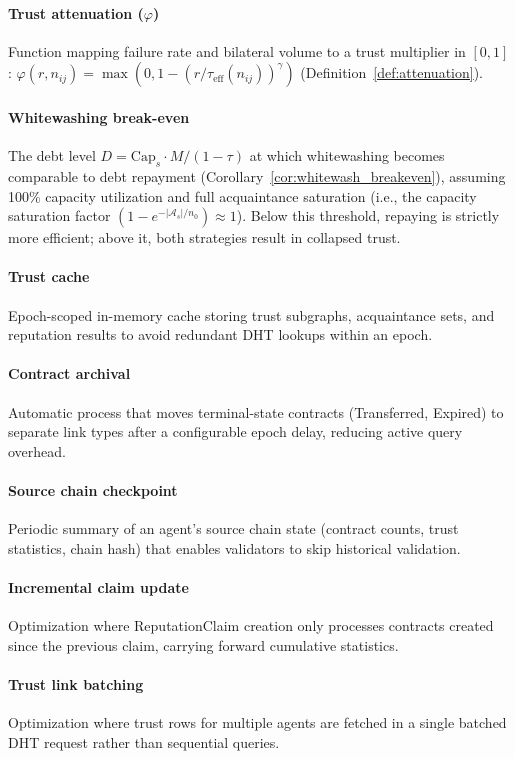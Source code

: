 \documentclass[11pt]{article}
\begin{document}
\paragraph{Trust attenuation ($\varphi$)} Function mapping failure rate and bilateral volume to a trust multiplier in $[0,1]$: $\varphi(r, n_{ij}) = \max(0, 1 - (r/\tau_{\text{eff}}(n_{ij}))^\gamma)$ (Definition~\ref{def:attenuation}).
\paragraph{Whitewashing break-even} The debt level $D = \text{Cap}_s \cdot M / (1-\tau)$ at which whitewashing becomes comparable to debt repayment (Corollary~\ref{cor:whitewash_breakeven}), assuming 100\% capacity utilization and full acquaintance saturation (i.e., the capacity saturation factor $(1 - e^{-|\mathcal{A}_s|/n_0}) \approx 1$). Below this threshold, repaying is strictly more efficient; above it, both strategies result in collapsed trust.
\paragraph{Trust cache} Epoch-scoped in-memory cache storing trust subgraphs, acquaintance sets, and reputation results to avoid redundant DHT lookups within an epoch.
\paragraph{Contract archival} Automatic process that moves terminal-state contracts (Transferred, Expired) to separate link types after a configurable epoch delay, reducing active query overhead.
\paragraph{Source chain checkpoint} Periodic summary of an agent's source chain state (contract counts, trust statistics, chain hash) that enables validators to skip historical validation.
\paragraph{Incremental claim update} Optimization where ReputationClaim creation only processes contracts created since the previous claim, carrying forward cumulative statistics.
\paragraph{Trust link batching} Optimization where trust rows for multiple agents are fetched in a single batched DHT request rather than sequential queries.
\end{document}
